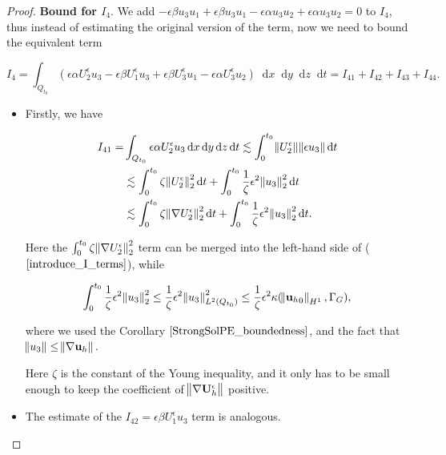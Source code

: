 \documentclass[12pt]{report}
\numberwithin{theorem}{chapter}
\numberwithin{corollary}{chapter}
\numberwithin{lemma}{chapter}
\numberwithin{remark}{chapter}
\numberwithin{definition}{chapter}
\numberwithin{prop}{chapter}
\newcommand*\diff{\mathop{}\!\mathrm{d}}
\begin{document}
\begin{proof}
  \textbf{Bound for $I_4.$} We add $ - \epsilon \beta u_3 u_1 +  \epsilon \beta u_3 u_1 - \epsilon \alpha u_3 u_2 + \epsilon \alpha u_3 u_2 = 0 $ to $I_4$, thus instead of estimating the original version of the term, now we need to bound the equivalent term

    $$ I_4 = \int_{Q_{t_0}}  ( \epsilon \alpha U_2^\epsilon u_3 - \epsilon \beta U_1^\epsilon u_3 + \epsilon \beta U_3^\epsilon u_1 - \epsilon \alpha U_3^\epsilon u_2 ) \diff x \diff y \diff z \diff t = I_{41} + I_{42} + I_{43} + I_{44}.$$
    
    \begin{itemize}
    
      \item Firstly, we have
      
      \begin{equation}
        \begin{split}
         I_{41} = & \int_{Q_{t_0}} \epsilon \alpha U_2^\epsilon u_3 \diff x \diff y \diff z \diff t \lesssim \int_0^{t_0} \norm{U_2^\epsilon} \norm{\epsilon u_3} \diff t \\
          & \lesssim \int_0^{t_0} \zeta \norm{U_2^\epsilon}^2_2 \diff t + \int_0^{t_0} \frac{1}{\zeta} \epsilon^2 \norm{u_3}^2_2 \diff t \\
          & \lesssim \int_0^{t_0} \zeta \norm{\nabla U_2^\epsilon}^2_2 \diff t + \int_0^{t_0} \frac{1}{\zeta} \epsilon^2 \norm{u_3}^2_2 \diff t.
        \end{split}
      \end{equation}
      
      Here the $\int_0^{t_0} \zeta \norm{\nabla U_2^\epsilon}^2_2$  term can be merged into the left-hand side of ($\ref{introduce_I_terms}$), while
      
      $$\int_0^{t_0} \frac{1}{\zeta} \epsilon^2 \norm{u_3}^2_2 \leq \frac{1}{\zeta} \epsilon^2 \norm{u_3}^2_{L^2(Q_{t_0})} \leq \frac{1}{\zeta} \epsilon^2 \kappa (\norm{{\mathbf{u}_h}_0}_{H^1}, \Gamma_G),$$
      
      where we used the Corollary $\ref{StrongSolPE_boundedness}$, and the fact that $\norm{u_3} \leq \norm{\nabla \mathbf{u}_h}.$
      
      Here $\zeta$ is the constant of the Young inequality, and it only has to be small enough to keep the coefficient of $\norm{\nabla \mathbf{U}_h^\epsilon}$ positive.
      
      \item The estimate of the $ I_{42} = \epsilon \beta U_1^\epsilon u_3$ term is analogous.
      

\end{itemize}
\end{proof}
\end{document}
